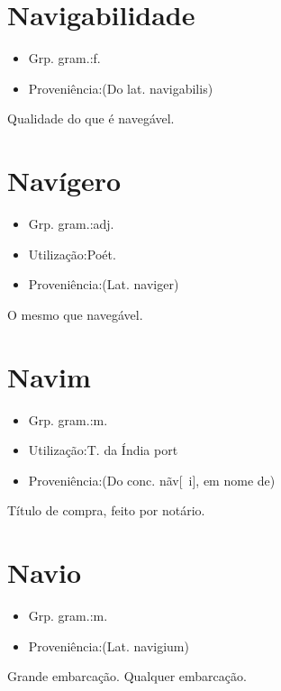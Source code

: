 \section{Navigabilidade}
\begin{itemize}
\item {Grp. gram.:f.}
\end{itemize}
\begin{itemize}
\item {Proveniência:(Do lat. \textunderscore navigabilis\textunderscore )}
\end{itemize}
Qualidade do que é navegável.
\section{Navígero}
\begin{itemize}
\item {Grp. gram.:adj.}
\end{itemize}
\begin{itemize}
\item {Utilização:Poét.}
\end{itemize}
\begin{itemize}
\item {Proveniência:(Lat. \textunderscore naviger\textunderscore )}
\end{itemize}
O mesmo que \textunderscore navegável\textunderscore .
\section{Navim}
\begin{itemize}
\item {Grp. gram.:m.}
\end{itemize}
\begin{itemize}
\item {Utilização:T. da Índia port}
\end{itemize}
\begin{itemize}
\item {Proveniência:(Do conc. \textunderscore nãv[~i]\textunderscore , em nome de)}
\end{itemize}
Título de compra, feito por notário.
\section{Navio}
\begin{itemize}
\item {Grp. gram.:m.}
\end{itemize}
\begin{itemize}
\item {Proveniência:(Lat. \textunderscore navigium\textunderscore )}
\end{itemize}
Grande embarcação.
Qualquer embarcação.

